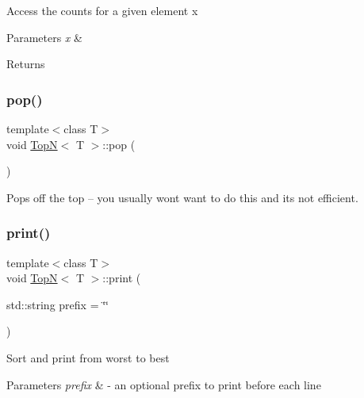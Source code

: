 Access the counts for a given element x 
\begin{DoxyParams}{Parameters}
{\em x} & \\
\hline
\end{DoxyParams}
\begin{DoxyReturn}{Returns}

\end{DoxyReturn}
\mbox{\label{class_top_n_a7f611b791e96b900e6a2b34432868157}} 
\subsubsection{\texorpdfstring{pop()}{pop()}}
{\footnotesize\ttfamily template$<$class T$>$ \\
void \hyperlink{class_top_n}{TopN}$<$ T $>$\+::pop (\begin{DoxyParamCaption}{ }\end{DoxyParamCaption})\hspace{0.3cm}{\ttfamily [inline]}}



Pops off the top -- you usually won\textquotesingle{}t want to do this and it\textquotesingle{}s not efficient. 

\mbox{\label{class_top_n_a5064ec2e4e9f1defdc3cb62d9b7ddd00}} 
\subsubsection{\texorpdfstring{print()}{print()}}
{\footnotesize\ttfamily template$<$class T$>$ \\
void \hyperlink{class_top_n}{TopN}$<$ T $>$\+::print (\begin{DoxyParamCaption}\item[{std\+::string}]{prefix = {\ttfamily \char`\"{}\char`\"{}} }\end{DoxyParamCaption})\hspace{0.3cm}{\ttfamily [inline]}}

Sort and print from worst to best 
\begin{DoxyParams}{Parameters}
{\em prefix} & -\/ an optional prefix to print before each line\\
\hline
\end{DoxyParams}
\mbox{\label{class_top_n_a378be54915dab8603b8408ee72310bb7}} 
